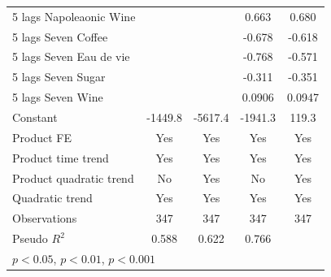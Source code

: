 \documentclass[12pt,a4paper,titlepage]{article}
\begin{document}
{\begin{longtable}{l*{4}{c}}
5 lags Napoleaonic Wine&                     &                     &       0.663\sym{*}  &       0.680         \\
5 lags Seven Coffee &                     &                     &      -0.678\sym{***}&      -0.618\sym{***}\\
5 lags Seven Eau de vie&                     &                     &      -0.768\sym{***}&      -0.571         \\
5 lags Seven Sugar  &                     &                     &      -0.311\sym{***}&      -0.351\sym{***}\\
5 lags Seven Wine   &                     &                     &      0.0906         &      0.0947         \\
Constant            &     -1449.8\sym{***}&     -5617.4\sym{***}&     -1941.3\sym{***}&       119.3         \\
Product FE          &         Yes         &         Yes         &         Yes         &         Yes         \\
Product time trend  &         Yes         &         Yes         &         Yes         &         Yes         \\
Product quadratic trend&          No         &         Yes         &          No         &         Yes         \\
Quadratic trend     &         Yes         &         Yes         &         Yes         &         Yes         \\
\midrule
Observations        &         347         &         347         &         347         &         347         \\
Pseudo \(R^{2}\)    &       0.588         &       0.622         &       0.766         &                     \\
\bottomrule
\multicolumn{5}{l}{\footnotesize \sym{*} \(p<0.05\), \sym{**} \(p<0.01\), \sym{***} \(p<0.001\)}\\
\end{longtable}
}





\newpage
\end{document}
